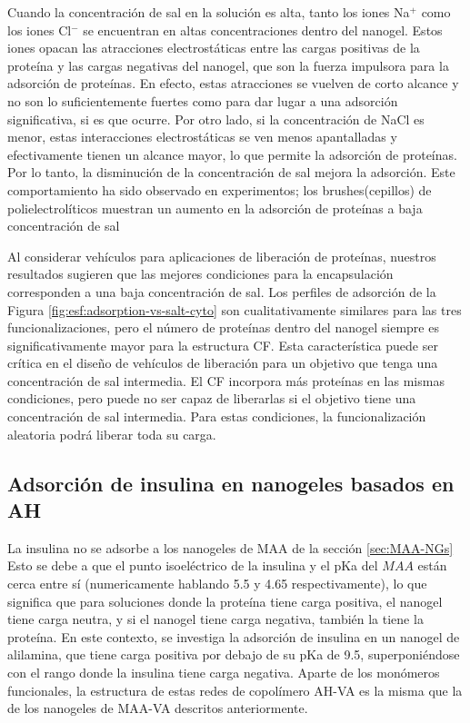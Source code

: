 Cuando la concentraci\'on de sal en la soluci\'on es alta, tanto los iones Na$^+$ como los iones Cl$^-$ se encuentran en altas concentraciones dentro del nanogel.
Estos iones opacan las atracciones electrost\'aticas entre las cargas positivas de la prote\'ina y las cargas negativas del nanogel, que son la fuerza impulsora para la adsorci\'on de prote\'inas.
En efecto, estas atracciones se vuelven de corto alcance y no son lo suficientemente fuertes como para dar lugar a una adsorci\'on significativa, si es que ocurre.
Por otro lado, si la concentraci\'on de NaCl es menor, estas interacciones electrost\'aticas se ven menos apantalladas y efectivamente tienen un alcance mayor, lo que permite la adsorci\'on de prote\'inas.
Por lo tanto, la disminuci\'on de la concentraci\'on de sal mejora la adsorci\'on.
Este comportamiento ha sido observado en experimentos; los brushes(cepillos) de  polielectrolíticos muestran un aumento en la adsorci\'on de prote\'inas a baja concentraci\'on de sal \cite{wittemann2006interaction,becker2012proteins, henzler2010adsorption,xu2018interaction}

Al considerar veh\'iculos para aplicaciones de liberaci\'on de prote\'inas, nuestros resultados sugieren que las mejores condiciones para la encapsulaci\'on corresponden a una baja concentraci\'on de sal.
Los perfiles de adsorci\'on de la Figura \ref{fig:esf:adsorption-vs-salt-cyto} son cualitativamente similares para las tres funcionalizaciones, pero el n\'umero de prote\'inas dentro del nanogel siempre es significativamente mayor para la estructura CF.
Esta caracter\'istica puede ser cr\'itica en el dise\~no de veh\'iculos de liberaci\'on para un objetivo que tenga una concentraci\'on de sal intermedia.
El CF incorpora m\'as prote\'inas en las mismas condiciones, pero puede no ser capaz de liberarlas si el objetivo tiene una concentraci\'on de sal intermedia.
Para estas condiciones, la funcionalizaci\'on aleatoria podr\'a liberar toda su carga.



\subsection{Adsorci\'on de insulina en nanogeles basados en  AH} 

La insulina no se adsorbe a los nanogeles de MAA de la secci\'on \ref{sec:MAA-NGs} %
Esto se debe a que el punto isoel\'ectrico de la insulina y el pKa del $MAA$ est\'an cerca entre s\'i (numericamente hablando 5.5 y 4.65 respectivamente), lo que significa que para soluciones donde la prote\'ina tiene carga positiva, el nanogel tiene carga neutra, y si el nanogel tiene carga negativa, tambi\'en la tiene la prote\'ina.
En este contexto, se investiga la adsorci\'on de insulina en un nanogel de alilamina, que tiene carga positiva por debajo de su pKa de 9.5, superponi\'endose con el rango donde la insulina tiene carga negativa.
Aparte de los mon\'omeros funcionales, la estructura de estas redes de copol\'imero AH-VA es la misma que la de los nanogeles de MAA-VA descritos anteriormente.


